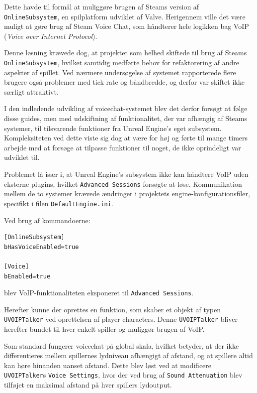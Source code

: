 Dette havde til formål at muliggøre brugen af Steams version af \texttt{OnlineSubsystem}, en spilplatform udviklet af Valve. Herigennem ville det være muligt at gøre brug af Steam Voice Chat, som håndterer hele logikken bag VoIP (\textit{Voice over Internet Protocol}).

Denne løsning krævede dog, at projektet som helhed skiftede til brug af Steams \texttt{OnlineSubsystem}, hvilket samtidig medførte behov for refaktorering af andre aspekter af spillet. Ved nærmere undersøgelse af systemet rapporterede flere brugere også problemer med tick rate og båndbredde, og derfor var skiftet ikke særligt attraktivt.

I den indledende udvikling af voicechat-systemet blev det derfor forsøgt at følge disse guides, men med udskiftning af funktionalitet, der var afhængig af Steams systemer, til tilsvarende funktioner fra Unreal Engine’s eget subsystem. Kompleksiteten ved dette viste sig dog at være for høj og førte til mange timers arbejde med at forsøge at tilpasse funktioner til noget, de ikke oprindeligt var udviklet til.

Problemet lå især i, at Unreal Engine’s subsystem ikke kan håndtere VoIP uden eksterne plugins, hvilket \texttt{Advanced Sessions} forsøgte at løse. Kommunikation mellem de to systemer krævede ændringer i projektets engine-konfigurationsfiler, specifikt i filen \texttt{DefaultEngine.ini}.

Ved brug af kommandoerne:

\begin{verbatim}
[OnlineSubsystem]
bHasVoiceEnabled=true

[Voice]
bEnabled=true
\end{verbatim}

blev VoIP-funktionaliteten eksponeret til \texttt{Advanced Sessions}.

Herefter kunne der oprettes en funktion, som skaber et objekt af typen \texttt{UVOIPTalker} ved oprettelsen af player characters. Denne \texttt{UVOIPTalker} bliver herefter bundet til hver enkelt spiller og muliggør brugen af VoIP.

Som standard fungerer voicechat på global skala, hvilket betyder, at der ikke differentieres mellem spillernes lydniveau afhængigt af afstand, og at spillere altid kan høre hinanden uanset afstand. Dette blev løst ved at modificere \texttt{UVOIPTalker}s \texttt{Voice Settings}, hvor der ved brug af \texttt{Sound Attenuation} blev tilføjet en maksimal afstand på hver spillers lydoutput.

